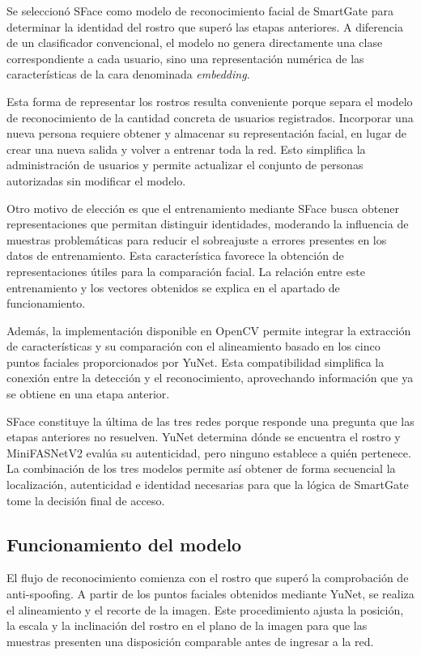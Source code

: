 Se seleccionó SFace como modelo de reconocimiento facial de SmartGate para determinar la identidad del rostro que superó las etapas anteriores. A diferencia de un clasificador convencional, el modelo no genera directamente una clase correspondiente a cada usuario, sino una representación numérica de las características de la cara denominada \textit{embedding}.

Esta forma de representar los rostros resulta conveniente porque separa el modelo de reconocimiento de la cantidad concreta de usuarios registrados. Incorporar una nueva persona requiere obtener y almacenar su representación facial, en lugar de crear una nueva salida y volver a entrenar toda la red. Esto simplifica la administración de usuarios y permite actualizar el conjunto de personas autorizadas sin modificar el modelo.

Otro motivo de elección es que el entrenamiento mediante SFace busca obtener representaciones que permitan distinguir identidades, moderando la influencia de muestras problemáticas para reducir el sobreajuste a errores presentes en los datos de entrenamiento. Esta característica favorece la obtención de representaciones útiles para la comparación facial. La relación entre este entrenamiento y los vectores obtenidos se explica en el apartado de funcionamiento.

Además, la implementación disponible en OpenCV permite integrar la extracción de características y su comparación con el alineamiento basado en los cinco puntos faciales proporcionados por YuNet. Esta compatibilidad simplifica la conexión entre la detección y el reconocimiento, aprovechando información que ya se obtiene en una etapa anterior.

SFace constituye la última de las tres redes porque responde una pregunta que las etapas anteriores no resuelven. YuNet determina dónde se encuentra el rostro y MiniFASNetV2 evalúa su autenticidad, pero ninguno establece a quién pertenece. La combinación de los tres modelos permite así obtener de forma secuencial la localización, autenticidad e identidad necesarias para que la lógica de SmartGate tome la decisión final de acceso.

\subsection{Funcionamiento del modelo}

El flujo de reconocimiento comienza con el rostro que superó la comprobación de anti-spoofing. A partir de los puntos faciales obtenidos mediante YuNet, se realiza el alineamiento y el recorte de la imagen. Este procedimiento ajusta la posición, la escala y la inclinación del rostro en el plano de la imagen para que las muestras presenten una disposición comparable antes de ingresar a la red.

